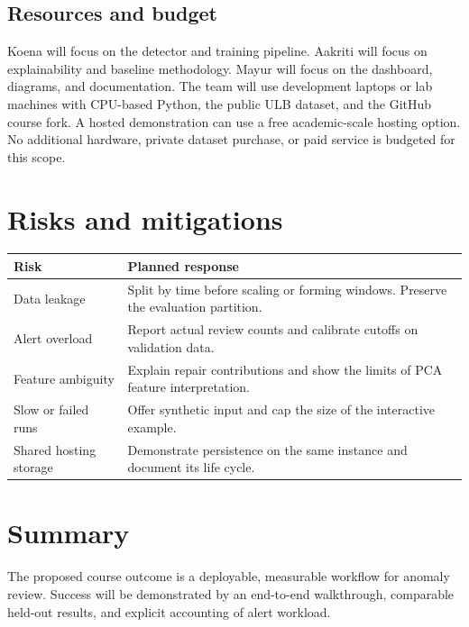 \documentclass[11pt,a4paper]{article}
\begin{document}
\subsection{Resources and budget}
Koena will focus on the detector and training pipeline. Aakriti will focus on explainability and baseline methodology. Mayur will focus on the dashboard, diagrams, and documentation. The team will use development laptops or lab machines with CPU-based Python, the public ULB dataset, and the GitHub course fork. A hosted demonstration can use a free academic-scale hosting option. No additional hardware, private dataset purchase, or paid service is budgeted for this scope.

\section{Risks and mitigations}
\begin{tabularx}{\linewidth}{@{}lX@{}}
\toprule
Risk & Planned response\\
\midrule
Data leakage & Split by time before scaling or forming windows. Preserve the evaluation partition.\\
Alert overload & Report actual review counts and calibrate cutoffs on validation data.\\
Feature ambiguity & Explain repair contributions and show the limits of PCA feature interpretation.\\
Slow or failed runs & Offer synthetic input and cap the size of the interactive example.\\
Shared hosting storage & Demonstrate persistence on the same instance and document its life cycle.\\
\bottomrule
\end{tabularx}

\section{Summary}
The proposed course outcome is a deployable, measurable workflow for anomaly review. Success will be demonstrated by an end-to-end walkthrough, comparable held-out results, and explicit accounting of alert workload.
\end{document}
